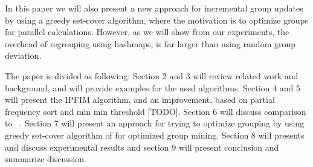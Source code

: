 In this paper we will also present a new approach for incremental group updates by using a greedy set-cover algorithm, where the motivation is to optimize groups for parallel calculations. However, as we will show from our experiments, the overhead of regrouping using hashmaps, is far larger than using random group deviation. 

The paper is divided as following: Section 2 and 3 will review related work and background, and will provide examples for the used algorithms. Section 4 and 5 will present the IPFIM algorithm, and an improvement, based on partial frequency sort and min min threshold  [TODO]. Section 6 will discuss comparison to ~\cite{song2017}.  Section 7 will present an approach for trying to optimize grouping by using greedy set-cover algorithm of  for optimized group mining. Section 8 will presents and discuss experimental results and section 9 will present conclusion and summarize discussion.
